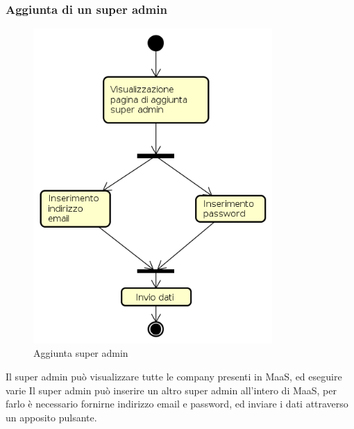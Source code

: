\subsubsection{Aggiunta di un super admin}
\begin{figure}[H]
\begin{center}
\includegraphics[height=12cm]{res/sections/backend/activities/aggiuntaSuperAdminSA.png}
\caption{Aggiunta super admin}
\end{center}
\end{figure}
Il super admin può visualizzare tutte le company presenti in MaaS, ed eseguire varie Il super admin può inserire un altro super admin all'intero di MaaS, per farlo è necessario fornirne indirizzo email e password, ed inviare i dati attraverso un apposito pulsante.
